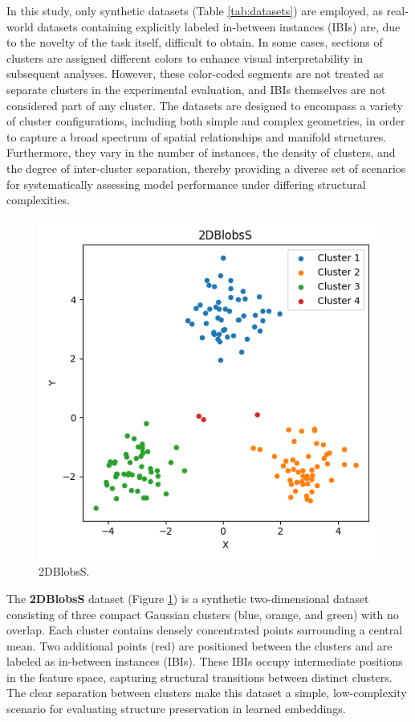 In this study, only synthetic datasets (Table \ref{tab:datasets}) are employed, as real-world datasets containing explicitly labeled in-between instances (IBIs) are, due to the novelty of the task itself, difficult to obtain. In some cases, sections of clusters are assigned different colors to enhance visual interpretability in subsequent analyses. However, these color-coded segments are not treated as separate clusters in the experimental evaluation, and IBIs themselves are not considered part of any cluster. The datasets are designed to encompass a variety of cluster configurations, including both simple and complex geometries, in order to capture a broad spectrum of spatial relationships and manifold structures. Furthermore, they vary in the number of instances, the density of clusters, and the degree of inter-cluster separation, thereby providing a diverse set of scenarios for systematically assessing model performance under differing structural complexities.
\newline

\newlength{\myimgwidth}
\setlength{\myimgwidth}{0.40\textwidth}

\begin{figure}
    \centering
    \includegraphics[width=\myimgwidth]{images/datasets/2DBlobsS.png}
    \caption{2DBlobsS.}
    \label{fig:2DBlobsS}
\end{figure}
The \textbf{2DBlobsS} dataset (Figure \ref{fig:2DBlobsS}) is a synthetic two-dimensional dataset consisting of three compact Gaussian clusters (blue, orange, and green) with no overlap. Each cluster contains densely concentrated points surrounding a central mean. Two additional points (red) are positioned between the clusters and are labeled as in-between instances (IBIs). These IBIs occupy intermediate positions in the feature space, capturing structural transitions between distinct clusters. The clear separation between clusters make this dataset a simple, low-complexity scenario for evaluating structure preservation in learned embeddings.
\newline


